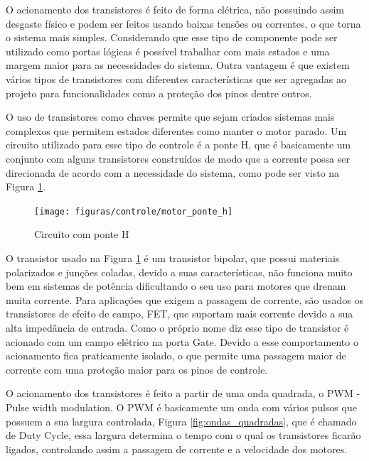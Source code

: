 O acionamento dos transistores é feito de forma elétrica, não possuindo assim desgaste físico e podem ser feitos usando baixas tensões ou correntes, o que torna o sistema mais simples. Considerando que esse tipo de componente pode ser utilizado como portas lógicas é possível trabalhar com mais estados e uma margem maior para as necessidades do sistema. Outra vantagem é que existem vários tipos de transistores com diferentes características que ser agregadas ao projeto para funcionalidades como a proteção dos pinos dentre outros.

O uso de transistores como chaves permite que sejam criados sistemas mais complexos que permitem estados diferentes como manter o motor parado. Um circuito utilizado para esse tipo de controle é a ponte H, que é basicamente um conjunto com alguns transistores construídos de modo que a corrente possa ser direcionada de acordo com a necessidade do sistema, como pode ser visto na Figura \ref{fig:motor_ponte_h}.

\begin{figure}[!htb]
\centering
  \texttt{[image: figuras/controle/motor\_ponte\_h]}
\caption{Circuito com ponte H}
\label{fig:motor_ponte_h}
\end{figure}

O transistor usado na Figura \ref{fig:motor_ponte_h} é um transistor bipolar, que possui materiais polarizados e junções coladas, devido a suas características, não funciona muito bem em sistemas de potência dificultando o seu uso para motores que drenam muita corrente. Para aplicações que exigem a passagem de corrente, são usados os transistores de efeito de campo, FET, que suportam mais corrente devido a sua alta impedância de entrada. Como o próprio nome diz esse tipo de transistor é acionado com um campo elétrico na porta Gate. Devido a esse comportamento o acionamento fica praticamente isolado, o que permite uma passagem maior de corrente com uma proteção maior para os pinos de controle.

O acionamento dos transistores é feito a partir de uma onda quadrada, o PWM - Pulse width modulation. O PWM é basicamente um onda com vários pulsos que possuem a sua largura controlada, Figura \ref{fig:ondas_quadradas}, que é chamado de Duty Cycle, essa largura determina o tempo com o qual os transistores ficarão ligados, controlando assim a passagem de corrente e a velocidade dos motores.

